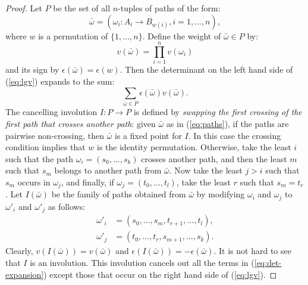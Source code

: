 \documentclass[11pt]{amsproc}
\theoremstyle{definition}
\theoremstyle{example}
\begin{document}
\begin{proof}
  Let $P$ be the set of all $n$-tuples of paths of the form:
  \begin{equation}
    \label{eq:paths}
    \bar\omega = (\omega_i:A_i\to B_{w(i)}, i=1,\dotsc, n),
  \end{equation}
  where $w$ is a permutation of $\{1,\dotsc, n\}$.
  Define the weight of $\bar\omega\in P$ by:
  \begin{displaymath}
    v(\bar\omega) = \prod_{i=1}^n v(\omega_i)
  \end{displaymath}
  and its sign by $\epsilon(\bar\omega)=\epsilon(w)$.
  Then the determinant on the left hand side of (\ref{eq:lgv}) expands to the sum:
  \begin{equation}
    \label{eq:det-expansion}
    \sum_{\bar\omega\in P} \epsilon(\bar\omega)v(\bar\omega).
  \end{equation}
  The cancelling involution $I:P\to P$ is defined by \emph{swapping the first crossing of the first path that crosses another path}: given $\bar\omega$ as in (\ref{eq:paths}), if the paths are pairwise non-crossing, then $\bar\omega$ is a fixed point for $I$.
  In this case the crossing condition implies that $w$ is the identity permutation.
  Otherwise, take the least $i$ such that the path $\omega_i=(s_0,\dotsc,s_k)$ crosses another path, and then the least $m$ such that $s_m$ belongs to another path from $\bar\omega$.
  Now take the least $j>i$ such that $s_m$ occurs in $\omega_j$, and finally, if $\omega_j=(t_0,\dotsc,t_l)$, take the least $r$ such that $s_m=t_r$.
  Let $I(\bar\omega)$ be the family of paths obtained from $\bar\omega$ by modifying $\omega_i$ and $\omega_j$ to $\omega'_i$ and $\omega'_j$ as follows:
  \begin{align*}
    \omega'_i & = (s_0,\dotsc, s_m, t_{r+1}, \dotsc, t_l),\\
    \omega'_j & = (t_0,\dotsc, t_r, s_{m+1}, \dotsc, s_k).
  \end{align*}
  Clearly, $v(I(\bar\omega)) = v(\bar\omega)$ and $\epsilon(I(\bar\omega)) = - \epsilon(\bar\omega)$.
  It is not hard to see that $I$ is an involution.
  This involution cancels out all the terms in (\ref{eq:det-expansion}) except those that occur on the right hand side of (\ref{eq:lgv}).
\end{proof}
\end{document}
